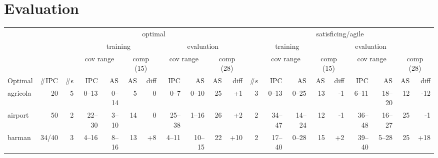 \documentclass{article}
\begin{document}
        \tableofcontents
        \newpage \section{{Evaluation}}
                        \begin{table}[h] \centering \scriptsize \setlength{\tabcolsep}{2pt}
                        \begin{tabular}{l@{}rr|rrrr|rrrr|r|rrrr|rrrr}
& & \multicolumn{9}{c}{optimal} & \multicolumn{9}{c}{satisficing/agile} \\
\cmidrule[\lightrulewidth](){3-11}
\cmidrule[\lightrulewidth](l){12-20}
& & & \multicolumn{4}{c}{training} & \multicolumn{4}{c}{evaluation} & \multicolumn{4}{c}{training} & \multicolumn{4}{c}{evaluation}\\
\cmidrule[\lightrulewidth](){4-7}
\cmidrule[\lightrulewidth](l){8-11}
\cmidrule[\lightrulewidth](){13-16}
\cmidrule[\lightrulewidth](l){17-20}
& & & \multicolumn{2}{c}{cov range} & \multicolumn{2}{c}{comp (15)} & \multicolumn{2}{c}{cov range} & \multicolumn{2}{c}{comp (28)} & & \multicolumn{2}{c}{cov range} & \multicolumn{2}{c}{comp (15)} & \multicolumn{2}{c}{cov range} & \multicolumn{2}{c}{comp (28)} \\
\cmidrule[\lightrulewidth](){4-5}
\cmidrule[\lightrulewidth](l){6-7}
\cmidrule[\lightrulewidth](l){8-9}
\cmidrule[\lightrulewidth](l){10-11}
\cmidrule[\lightrulewidth](){13-14}
\cmidrule[\lightrulewidth](l){15-16}
\cmidrule[\lightrulewidth](l){17-18}
       Optimal &  \#IPC & \#s &      IPC &      AS &  AS &              diff &      IPC &      AS &  AS &               diff & \#s &       IPC &      AS &  AS &               diff &       IPC &      AS &  AS &               diff \\
\midrule
      agricola &     20 &   5 &    0--13 &   0--14 &   5 &                 0 &     0--7 &   0--10 &  25 &   {\color{blue}+1} &   3 &     0--13 &   0--25 &  13 &    {\color{red}-1} &     6--11 &  18--20 &  12 &   {\color{red}-12} \\
       airport &     50 &   2 &   22--30 &   3--10 &  14 &                 0 &   25--38 &   1--16 &  26 &   {\color{blue}+2} &   2 &    34--47 &  14--24 &  12 &    {\color{red}-1} &    36--48 &  16--27 &  25 &    {\color{red}-1} \\
        barman &  34/40 &   3 &    4--16 &   8--16 &  13 &  {\color{blue}+8} &    4--11 &  10--15 &  22 &  {\color{blue}+10} &   2 &    17--40 &   0--28 &  15 &   {\color{blue}+2} &    39--40 &   5--28 &  25 &  {\color{blue}+18} \\

\end{tabular}
\end{table}
\end{document}
